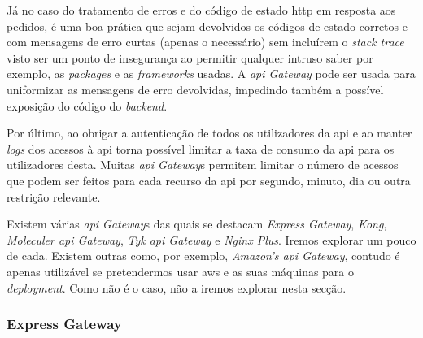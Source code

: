 Já no caso do tratamento de erros e do código de estado \acrshort{http} em resposta aos pedidos, é uma boa prática que sejam devolvidos os códigos de estado corretos e com mensagens de erro curtas (apenas o necessário) sem incluírem o \textit{stack trace} visto ser um ponto de insegurança ao permitir qualquer intruso saber por exemplo, as \textit{packages} e as \textit{frameworks} usadas. A \textit{\acrshort{api} Gateway} pode ser usada para uniformizar as mensagens de erro devolvidas, impedindo também a possível exposição do código do \textit{backend}.

Por último, ao obrigar a autenticação de todos os utilizadores da \acrshort{api} e ao manter \textit{logs} dos acessos à \acrshort{api} torna possível limitar a taxa de consumo da \acrshort{api} para os utilizadores desta. Muitas \textit{\acrshort{api} Gateway}s permitem limitar o número de acessos que podem ser feitos para cada recurso da \acrshort{api} por segundo, minuto, dia ou outra restrição relevante.

Existem várias \textit{\acrshort{api} Gateway}s das quais se destacam \textit{Express Gateway}, \textit{Kong}, \textit{Moleculer \acrshort{api} Gateway}, \textit{Tyk \acrshort{api} Gateway} e \textit{Nginx Plus}. Iremos explorar um pouco de cada. Existem outras como, por exemplo, \textit{Amazon's \acrshort{api} Gateway}, contudo é apenas utilizável se pretendermos usar \acrshort{aws} e as suas máquinas para o \textit{deployment}. Como não é o caso, não a iremos explorar nesta secção.

\subsubsection{Express Gateway}

